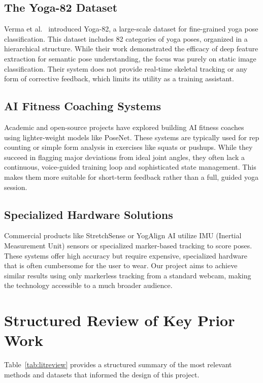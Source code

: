 \subsection{The Yoga-82 Dataset}
Verma et al.~\cite{verma2020yoga82} introduced Yoga-82, a large-scale dataset for fine-grained yoga pose classification. This dataset includes 82 categories of yoga poses, organized in a hierarchical structure. While their work demonstrated the efficacy of deep feature extraction for semantic pose understanding, the focus was purely on static image classification. Their system does not provide real-time skeletal tracking or any form of corrective feedback, which limits its utility as a training assistant.

\subsection{AI Fitness Coaching Systems}
Academic and open-source projects have explored building AI fitness coaches using lighter-weight models like PoseNet. These systems are typically used for rep counting or simple form analysis in exercises like squats or pushups. While they succeed in flagging major deviations from ideal joint angles, they often lack a continuous, voice-guided training loop and sophisticated state management. This makes them more suitable for short-term feedback rather than a full, guided yoga session.

\subsection{Specialized Hardware Solutions}
Commercial products like StretchSense or YogAlign AI utilize IMU (Inertial Measurement Unit) sensors or specialized marker-based tracking to score poses. These systems offer high accuracy but require expensive, specialized hardware that is often cumbersome for the user to wear. Our project aims to achieve similar results using only markerless tracking from a standard webcam, making the technology accessible to a much broader audience.

\section{Structured Review of Key Prior Work}
Table~\ref{tab:litreview} provides a structured summary of the most relevant methods and datasets that informed the design of this project.


